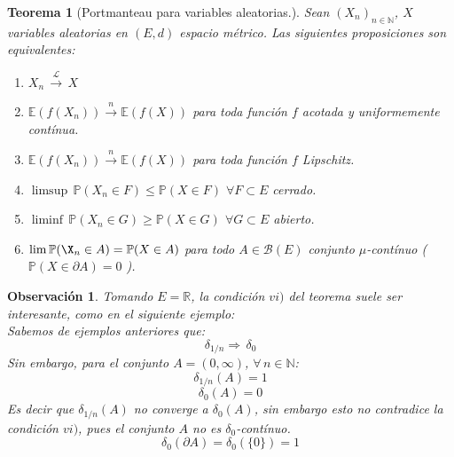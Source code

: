 \documentclass[a4paper]{article}
\newtheorem{teorema}{Teorema}
\numberwithin{equation}{subsection}
\newtheorem{obs}{Observación}
\def\R{\mathbb R}
\def\N{\mathbb N}
\def\E{\mathbb E}
\newcommand{\pb}{\mathbb{P}}
\begin{document}
\begin{teorema}[Portmanteau para variables aleatorias.] Sean $(X_n)_{n\in\N}$, $X$ variables aleatorias en $(E,d)$ espacio métrico. Las siguientes proposiciones son equivalentes:
\begin{enumerate}
    \item[i)] $X_n\,\xrightarrow{\mathcal{L}}\,X$
    \item[ii)] $\E(f(X_n)) \xrightarrow{\,\,n\,\,}\E(f(X))$ para toda función $f$ acotada y uniformemente contínua.
    \item[iii)] $\E(f(X_n)) \xrightarrow{\,\,n\,\,}\E(f(X))$ para toda función $f$ Lipschitz.
    \item[iv)] $\limsup\,\pb(X_n \in F) \leq \pb(X\in F)$ $\forall F\subset E$ cerrado.
    \item[v)] $\liminf\,\pb(X_n \in G) \geq \pb(X \in G)$ $\forall G\subset E$ abierto.
    \item[vi)] $\lim \pb(\X_n \in A) = \pb(X\in A)$ para todo $A\in \mathcal{B}(E)$ conjunto $\mu$-contínuo ( $\pb(X \in \partial A) = 0$ ).
\end{enumerate}
\end{teorema}

\begin{obs} Tomando $E=\R$, la condición $vi)$ del teorema suele ser interesante, como en el siguiente ejemplo:\\ Sabemos de ejemplos anteriores que:
\[\delta_{1/n}\Rightarrow \,\delta_{0}\]
Sin embargo, para el conjunto $A=(0,\infty)$, $\forall\,n\in\N$:
\[\delta_{1/n}(A) = 1\]
\[\delta_{0}(A) = 0\]
Es decir que $\delta_{1/n}(A)$ no converge a $\delta_{0}(A)$, sin embargo esto no contradice la condición $vi)$, pues el conjunto $A$ no es $\delta_0$-contínuo.
\[\delta_{0}(\partial A) = \delta_{0}(\{0\}) = 1\]
\end{obs}
\end{document}
